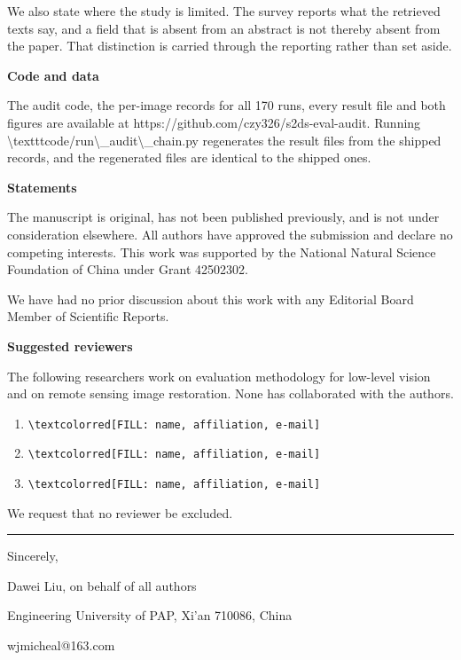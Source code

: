 \documentclass[11pt]{article}
\begin{document}
We also state where the study is limited. The survey reports what the retrieved texts say, and a field that is absent from an abstract is not thereby absent from the paper. That distinction is carried through the reporting rather than set aside.

\medskip\noindent\textbf{Code and data}

The audit code, the per-image records for all 170 runs, every result file and both figures are available at https://github.com/czy326/s2ds-eval-audit. Running \textbackslash{}texttt{code/run\textbackslash{}\_audit\textbackslash{}\_chain.py} regenerates the result files from the shipped records, and the regenerated files are identical to the shipped ones.

\medskip\noindent\textbf{Statements}

The manuscript is original, has not been published previously, and is not under consideration elsewhere. All authors have approved the submission and declare no competing interests. This work was supported by the National Natural Science Foundation of China under Grant 42502302.

We have had no prior discussion about this work with any Editorial Board Member of Scientific Reports.

\medskip\noindent\textbf{Suggested reviewers}

The following researchers work on evaluation methodology for low-level vision and on remote sensing image restoration. None has collaborated with the authors.

\begin{enumerate}
\item \texttt{\textbackslash{}textcolor{red}{[FILL: name, affiliation, e-mail]}}
\item \texttt{\textbackslash{}textcolor{red}{[FILL: name, affiliation, e-mail]}}
\item \texttt{\textbackslash{}textcolor{red}{[FILL: name, affiliation, e-mail]}}
\end{enumerate}

We request that no reviewer be excluded.

\medskip\hrule\medskip

Sincerely,

Dawei Liu, on behalf of all authors

Engineering University of PAP, Xi'an 710086, China

wjmicheal@163.com
\end{document}
